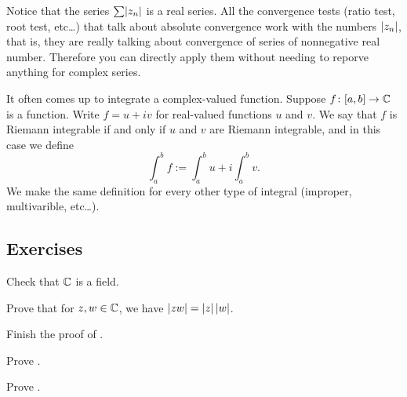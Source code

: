 Notice that the series $\sum \lvert {z_n} \rvert$ is a real series.  All the
convergence tests (ratio test, root test, etc\ldots) that talk about
absolute convergence work with the numbers $\lvert {z_n} \rvert$, that is, they
are really talking about convergence of series of nonnegative real
number.
Therefore you
can directly apply them without needing to reporve anything for complex
series.

\medskip

It often comes up to integrate a complex-valued function.  Suppose
$f \colon [a,b] \to {\mathbb{C}}$ is a function.  Write
$f = u+iv$ for real-valued functions $u$ and $v$.  We say
that $f$ is Riemann integrable if and only if $u$ and $v$ are Riemann
integrable, and in this case we define
\begin{equation*}
\int_a^b f := \int_a^b u + i \int_a^b v .
\end{equation*}
We make the same definition for every other type of integral (improper,
multivarible, etc\ldots).

\subsection{Exercises}

\begin{exercise}
Check that ${\mathbb{C}}$ is a field.
\end{exercise}

\begin{exercise}
Prove that for $z,w \in {\mathbb{C}}$, we have
$\lvert {zw} \rvert = \lvert {z} \rvert \, \lvert {w} \rvert$.
\end{exercise}

\begin{exercise}
Finish the proof of .
\end{exercise}

\begin{exercise}
Prove .
\end{exercise}

\begin{exercise}
Prove .
\end{exercise}

